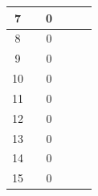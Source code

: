 \begin{table}[]
\begin{tabular}{|c|c|c|c|c|c|}
 		7                                            &                                  & 0                                &                                  &                                  &                                                     \\ \hline
 		8                                            &                                  & 0                                &                                  &                                  &                                                     \\ \hline
 		9                                            &                                  & 0                                &                                  &                                  &                                                     \\ \hline
 		10                                           &                                  & 0                                &                                  &                                  &                                                     \\ \hline
 		11                                           &                                  & 0                                &                                  &                                  &                                                     \\ \hline
 		12                                           &                                  & 0                                &                                  &                                  &                                                     \\ \hline
 		13                                           &                                  & 0                                &                                  &                                  &                                                     \\ \hline
 		14                                           &                                  & 0                                &                                  &                                  &                                                     \\ \hline
 		15                                           &                                  & 0                                &                                  &                                  &                                                     \\ \hline

\end{tabular}
\end{table}
